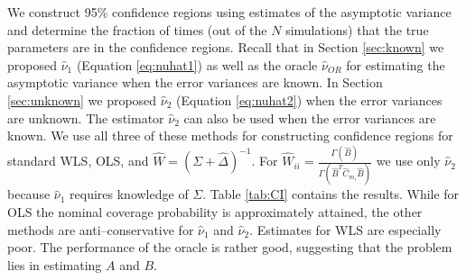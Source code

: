 \documentclass[ejs,ps,preprint]{imsart}
\numberwithin{equation}{section}
\theoremstyle{plain}
\begin{document}
We construct 95\% confidence regions using estimates of the asymptotic variance and determine the fraction of times (out of the $N$ simulations) that the true parameters are in the confidence regions. Recall that in Section \ref{sec:known} we proposed $\widehat{\nu}_1$ (Equation \eqref{eq:nuhat1}) as well as the oracle $\widehat{\nu}_{OR}$ for estimating the asymptotic variance when the error variances are known. In Section \ref{sec:unknown} we proposed $\widehat{\nu}_2$ (Equation \eqref{eq:nuhat2}) when the error variances are unknown. The estimator $\widehat{\nu}_2$ can also be used when the error variances are known. We use all three of these methods for constructing confidence regions for standard WLS, OLS, and $\widehat{W} = (\Sigma + \widehat{\Delta})^{-1}$. For $\widehat{W}_{ii} = \frac{\Gamma(\widehat{B})}{\Gamma(\widehat{B}^T\widehat{C}_{m_i}\widehat{B})}$ we use only $\widehat{\nu}_2$ because $\widehat{\nu}_1$ requires knowledge of $\Sigma$. Table \ref{tab:CI} contains the results. While for OLS the nominal coverage probability is approximately attained, the other methods are anti--conservative for $\widehat{\nu}_1$ and $\widehat{\nu}_2$. Estimates for WLS are especially poor. The performance of the oracle is rather good, suggesting that the problem lies in estimating $A$ and $B$. 
\end{document}
